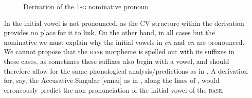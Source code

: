 \documentclass[output=paper]{langscibook}
\begin{document}
\begin{figure}
    \centering
    \begin{minipage}[t]{.3\textwidth}
    \end{minipage}
    \begin{minipage}[t]{.1\textwidth}
        \rightarrow 
    \end{minipage}
    \begin{minipage}[t]{.3\textwidth}
        \centering
        [nãã]
    \end{minipage}
    \caption{Derivation of the 1\textsc{sg} nominative pronoun}
    \label{new17}
\end{figure}

In  the initial vowel is not pronounced, as the CV structure within the derivation provides no place for it to link. On the other hand, in all cases but the nominative we must explain why the initial vowels in \textit{en} and \textit{on} are pronounced. We cannot propose that the \textsc{base} morpheme is spelled out with its suffixes in these cases, as sometimes these suffixes also begin with a vowel, and should therefore allow for the same phonological analysis/predictions as in . A derivation for, say, the Accusative Singular [ennai] as in , along the lines of , would erroneously predict the non-pronunciation of the initial vowel of the \textsc{base}.
\end{document}

